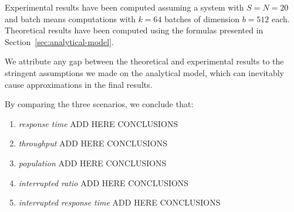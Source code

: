 Experimental results have been computed assuming a system with $S=N=20$ and batch means computations with $k=64$ batches of dimension $b=512$ each.
%
Theoretical results have been computed using the formulas presented in Section~\ref{sec:analytical-model}.

We attribute any gap between the theoretical and experimental results to the stringent assumptions we made on the analytical model, which can inevitably cause approximations in the final results.

By comparing the three scenarios, we conclude that:

\begin{enumerate}
	\item \textit{response time} ADD HERE CONCLUSIONS
	
	\item \textit{throughput} ADD HERE CONCLUSIONS
	
	\item \textit{population} ADD HERE CONCLUSIONS
	
	\item \textit{interrupted ratio} ADD HERE CONCLUSIONS
	
	\item \textit{interrupted response time} ADD HERE CONCLUSIONS
\end{enumerate}



